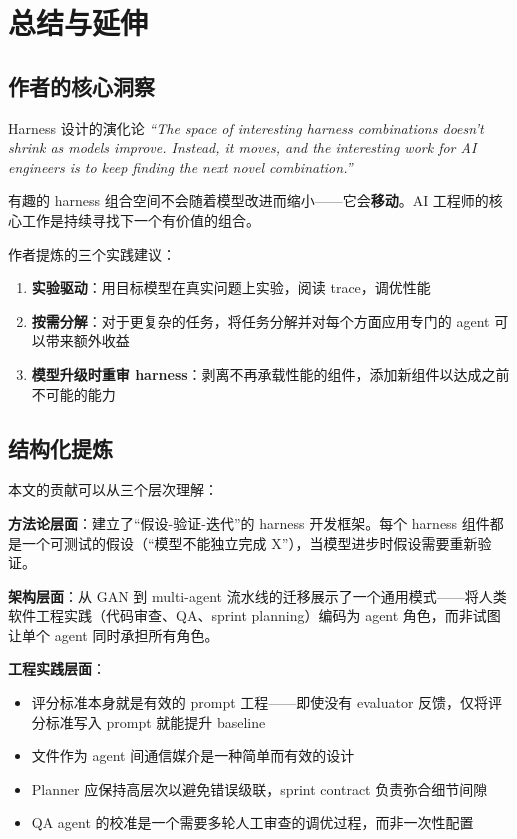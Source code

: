 \section{总结与延伸}

\subsection{作者的核心洞察}

\begin{importantbox}{Harness 设计的演化论}
\textit{``The space of interesting harness combinations doesn't shrink as models improve. Instead, it moves, and the interesting work for AI engineers is to keep finding the next novel combination.''}

有趣的 harness 组合空间不会随着模型改进而缩小——它会\textbf{移动}。AI 工程师的核心工作是持续寻找下一个有价值的组合。
\end{importantbox}

作者提炼的三个实践建议：

\begin{enumerate}
    \item \textbf{实验驱动}：用目标模型在真实问题上实验，阅读 trace，调优性能
    \item \textbf{按需分解}：对于更复杂的任务，将任务分解并对每个方面应用专门的 agent 可以带来额外收益
    \item \textbf{模型升级时重审 harness}：剥离不再承载性能的组件，添加新组件以达成之前不可能的能力
\end{enumerate}

\subsection{结构化提炼}

本文的贡献可以从三个层次理解：

\textbf{方法论层面}：建立了``假设-验证-迭代''的 harness 开发框架。每个 harness 组件都是一个可测试的假设（``模型不能独立完成 X''），当模型进步时假设需要重新验证。

\textbf{架构层面}：从 GAN 到 multi-agent 流水线的迁移展示了一个通用模式——将人类软件工程实践（代码审查、QA、sprint planning）编码为 agent 角色，而非试图让单个 agent 同时承担所有角色。

\textbf{工程实践层面}：
\begin{itemize}
    \item 评分标准本身就是有效的 prompt 工程——即使没有 evaluator 反馈，仅将评分标准写入 prompt 就能提升 baseline
    \item 文件作为 agent 间通信媒介是一种简单而有效的设计
    \item Planner 应保持高层次以避免错误级联，sprint contract 负责弥合细节间隙
    \item QA agent 的校准是一个需要多轮人工审查的调优过程，而非一次性配置
\end{itemize}

